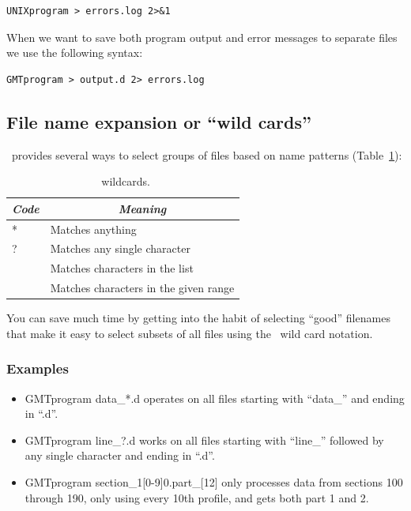 \documentclass{report}
\begin{document}
{\small\begin{verbatim}
UNIXprogram > errors.log 2>&1
\end{verbatim}
}

When we want to save both program output and error messages to
separate files we use the following syntax:

{\small\begin{verbatim}
GMTprogram > output.d 2> errors.log
\end{verbatim}
}

\subsection{File name expansion or ``wild cards''}

\UNIX\ provides several ways to select groups of files based
on name patterns (Table~\ref{tbl:wildcard}):

\begin{table}[h]
\small
\centering
\begin{tabular}{|l|l|} \hline
\multicolumn{1}{|c|}{\emph{Code}} & \multicolumn{1}{c|}{\emph{Meaning}} \\ \hline
*       &       Matches anything \\ \hline
?       &       Matches any single character \\ \hline
[\emph{list}]   &       Matches characters in the list \\ \hline
[\emph{range}]  &       Matches characters in the given range \\ \hline
\end{tabular}
\caption{\UNIX\ wildcards.} \label{tbl:wildcard}
\end{table}
 
\noindent
You can save much time by getting into the habit of selecting
``good'' filenames that make it easy to select subsets of all
files using the \UNIX\ wild card notation.

\subsubsection{Examples}

\begin{itemize}
\item GMTprogram data\_*.d operates on all files starting with
``data\_'' and ending in ``.d''.

\item GMTprogram line\_?.d works on all files starting with
``line\_'' followed by any single character and ending in ``.d''.

\item GMTprogram section\_1[0-9]0.part\_[12] only processes data
from sections 100 through 190, only using every 10th profile, and
gets both part 1 and 2.

\end{itemize} 
\end{document}

